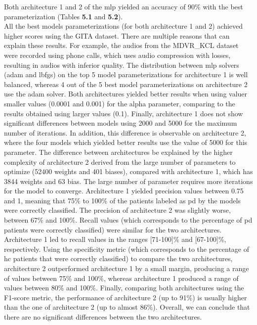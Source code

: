 Both architecture 1 and 2 of the \gls{mlp} yielded an accuracy of 90\% with the best parameterization (Tables \textbf{5.1} and \textbf{5.2}). \\
All the best models parameterizations (for both architecture 1 and 2) achieved higher scores using the GITA dataset. There are multiple reasons that can explain these results. For example, the audios from the MDVR\_KCL dataset were recorded using phone calls, which uses audio compression with losses, resulting in audios with inferior quality. The distribution between \gls{mlp} solvers (adam and lbfgs) on the top 5 model parameterizations for architecture 1 is well balanced, whereas 4 out of the 5 best model parameterizations on architecture 2 use the adam solver. Both architectures yielded better results when using valuer smaller values (0.0001 and 0.001) for the alpha parameter, comparing to the results obtained using larger values (0.1). Finally, architecture 1 does not show significant differences between models using 2000 and 5000 for the maximum number of iterations. In addition, this difference is observable on architecture 2, where the four models which yielded better results use the value of 5000 for this parameter. The difference between architectures be explained by the higher complexity of architecture 2 derived from the large number of parameters to optimize (52400 weights and 401 biases), compared with architecture 1, which has 3844 weights and 63 bias. The large number of parameter requires more iterations for the model to converge.
Architecture 1 yielded precision values between 0.75 and 1, meaning that 75\% to 100\% of the patients labeled as \gls{pd} by the models were correctly classified. The precision of architecture 2 was slightly worse, between 67\% and 100\%. Recall values (which corresponds to the percentage of \gls{pd} patients were correctly classified) were similar for the two architectures. Architecture 1 led to recall values in the ranges [71-100]\% and [67-100]\%, respectively. Using the specificity metric (which corresponds to the percentage of \gls{hc} patients that were correctly classified) to compare the two architectures, architecture 2 outperformed architecture 1 by a small margin, producing a range of values between 75\% and 100\%, whereas architecture 1 produced a range of values between 80\% and 100\%. Finally, comparing both architectures using the F1-score metric, the performance of architecture 2 (up to 91\%) is usually higher than the one of architecture 2 (up to almost 86\%).
Overall, we can conclude that there are no significant differences between the two architectures.

